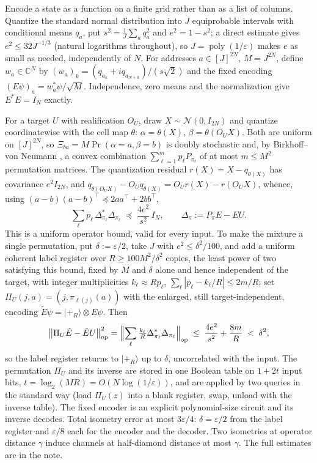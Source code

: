 \documentclass[11pt,a4paper]{article}
\theoremstyle{plain}
\theoremstyle{definition}
\theoremstyle{remark}
\DeclareMathOperator{\poly}{poly}
\DeclareMathOperator{\op}{op}
\newcommand{\C}{\mathbb C}
\begin{document}
Encode a state as a function on a finite grid rather than as a list of columns. Quantize the
standard normal distribution into $J$ equiprobable intervals with conditional means $q_a$,
put $s^2=\tfrac1J\sum_aq_a^2$ and $e^2=1-s^2$; a direct estimate gives $e^2\le32J^{-1/3}$
(natural logarithms throughout), so $J=\poly(1/\varepsilon)$ makes $e$ as small as needed,
independently of $N$. For addresses $a\in[J]^{2N}$, $M=J^{2N}$, define $w_a\in\C^N$ by
$(w_a)_k=(q_{a_k}+iq_{a_{N+k}})/(s\sqrt2)$ and the fixed encoding $(E\psi)_a=w_a^{*}\psi/\sqrt M$.
Independence, zero means and the normalization give $E^{*}E=I_N$ exactly.

For a target $U$ with realification $O_U$, draw $X\sim\mathcal N(0,I_{2N})$ and quantize
coordinatewise with the cell map $\theta$: $\alpha=\theta(X)$, $\beta=\theta(O_UX)$. Both are
uniform on $[J]^{2N}$, so $\Xi_{ba}=M\Pr(\alpha=a,\beta=b)$ is doubly stochastic and, by
Birkhoff--von Neumann \cite{Bir46}, a convex combination $\sum_{\ell=1}^{m}p_\ell P_{\pi_\ell}$
of at most $m\le M^2$ permutation matrices. The quantization residual $r(X)=X-q_{\theta(X)}$
has covariance $e^2I_{2N}$, and $q_{\theta(O_UX)}-O_Uq_{\theta(X)}=O_Ur(X)-r(O_UX)$, whence,
using
$(a-b)(a-b)^{\top}\preceq2aa^{\top}+2bb^{\top}$,
\[
\sum_\ell p_\ell\,\Delta_{\pi_\ell}^{*}\Delta_{\pi_\ell}\;\preceq\;\frac{4e^2}{s^2}\,I_N,
\qquad\Delta_\pi:=P_\pi E-EU.
\]
This is a uniform operator bound, valid for every input. To make the mixture a single
permutation, put $\delta:=\varepsilon/2$, take $J$ with $e^2\le\delta^2/100$, and add a
uniform coherent label register over $R\ge100M^2/\delta^2$ copies, the least power of two satisfying this bound, fixed by
$M$ and $\delta$ alone and hence independent of the target, with integer multiplicities
$k_\ell\approx Rp_\ell$, $\sum_\ell|p_\ell-k_\ell/R|\le2m/R$; set
$\Pi_U(j,a)=(j,\pi_{\ell(j)}(a))$ with the enlarged, still target-independent, encoding
$\tilde E\psi=|+_R\rangle\otimes E\psi$. Then
\[
\bigl\|\Pi_U\tilde E-\tilde EU\bigr\|_{\op}^2
=\Bigl\|\sum_\ell\tfrac{k_\ell}{R}\Delta_{\pi_\ell}^{*}\Delta_{\pi_\ell}\Bigr\|_{\op}
\;\le\;\frac{4e^2}{s^2}+\frac{8m}{R}\;<\;\delta^2,
\]
so the label register returns to $|+_R\rangle$ up to $\delta$, uncorrelated with the input.
The permutation $\Pi_U$ and its inverse are stored in one Boolean table on $1+2t$ input
bits, $t=\log_2(MR)=O(N\log(1/\varepsilon))$, and are applied by two queries in the standard
way (load $\Pi_U(z)$ into a blank register, swap, unload with the inverse table). The fixed
encoder is an explicit polynomial-size circuit and its inverse decodes. Total isometry error
at most $3\varepsilon/4$: $\delta=\varepsilon/2$ from the label register and $\varepsilon/8$
each for the encoder and the decoder. Two isometries at operator distance $\gamma$ induce
channels at half-diamond distance at most $\gamma$. The full estimates are in the note.
\end{document}
